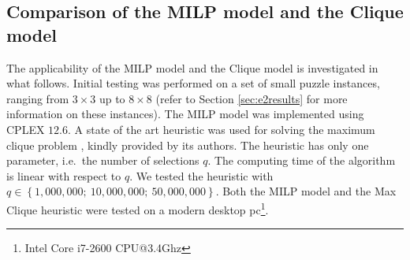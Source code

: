 \documentclass[preprint,12pt]{elsarticle}
\begin{document}
{\subsection{Comparison of the MILP model and the Clique model}
The applicability of the MILP model and the Clique model is investigated in what follows. Initial testing was performed on a set of small puzzle instances, ranging from $3\times3$ up to $8\times8$ (refer to Section \ref{sec:e2results} for more information on these instances).
The MILP model was implemented using CPLEX $12.6$.
A state of the art heuristic was used for solving the maximum clique problem \cite{GLP08}, 
kindly provided by its authors.
The heuristic has only one parameter, i.e.\ the number of selections $q$.
The computing time of the algorithm is linear with respect to $q$. 
We tested the heuristic with $q \in \left\{ 1,000,000;\ 10,000,000;\ 50,000,000  \right\}$.
Both the MILP model and the Max Clique heuristic were tested  on a modern desktop pc\footnote{Intel Core i7-2600 CPU@3.4Ghz}.

}
\end{document}
